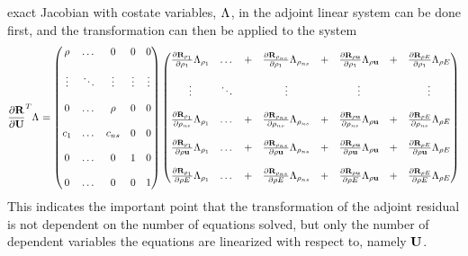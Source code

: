 exact Jacobian with costate variables, $\Lambda_{}$, in the adjoint linear system
can be done first, and the transformation can then be applied to the system
\begin{equation}
  \begin{aligned}
    \pd{\mr}{\mU}^{T} \adjlam{} =
    \begin{pmatrix}
      \rho   & \dots  & 0      &  0      & 0      \\ \\
      \vdots & \ddots & \vdots &  \vdots & \vdots \\ \\
      0      & \dots  &\rho    &  0      & 0      \\ \\
      c_1    & \dots  & c_{ns} &  0      & 0      \\ \\
      0      & \dots  & 0      &  1      & 0      \\ \\
      0      & \dots  & 0      &  0      & 1
    \end{pmatrix}
    \begin{pmatrix}
      \rlprod{\rho_1}{\rho_1}    & \dots  &+& \rlprod{\rho_{ns}}{\rho_1}    &+& \rlprod{\rho \vu}{\rho_1}    &+& \rlprod{\rho E}{\rho_1} \\ \\
      \vdots                     & \ddots & & \vdots                        & & \vdots                       & & \vdots                   \\ \\
      \rlprod{\rho_1}{\rho_{ns}} & \dots  &+& \rlprod{\rho_{ns}}{\rho_{ns}} &+& \rlprod{\rho \vu}{\rho_{ns}} &+& \rlprod{\rho E}{\rho_{ns}} \\ \\
      \rlprod{\rho_1}{\rho \vu}  & \dots  &+& \rlprod{\rho_{ns}}{\rho \vu}  &+& \rlprod{\rho \vu}{\rho \vu}  &+& \rlprod{\rho E}{\rho \vu} \\ \\
      \rlprod{\rho_1}{\rho E}    & \dots  &+& \rlprod{\rho_{ns}}{\rho E}    &+& \rlprod{\rho \vu}{\rho E}    &+& \rlprod{\rho E}{\rho E}
    \end{pmatrix}
  \end{aligned}
  \label{adj-drdv}
\end{equation}
This indicates the important point that the transformation of the adjoint
residual is not dependent on the number of equations solved, but only the number
of dependent variables the equations are linearized with respect to, namely
$\mathbf U$.

